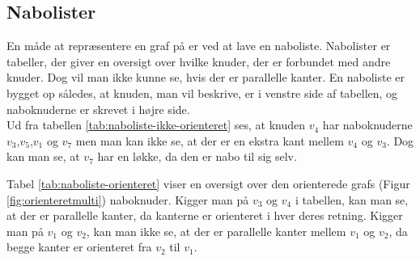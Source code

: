 \subsection{Nabolister}
En måde at repræsentere en graf på er ved at lave en naboliste. Nabolister er tabeller, der giver en oversigt over hvilke knuder, der er forbundet med andre knuder. Dog vil man ikke kunne se, hvis der er parallelle kanter. En naboliste er bygget op således, at knuden, man vil beskrive, er i venstre side af tabellen, og naboknuderne er skrevet i højre side. \\




Ud fra tabellen \ref{tab:naboliste-ikke-orienteret} ses, at knuden $v_4$ har naboknuderne $v_3$,$v_5$,$v_1$ og $v_7$ men man kan ikke se, at der er en ekstra kant mellem $v_4$ og $v_3$. Dog kan man se, at $v_7$ har en løkke, da den er nabo til sig selv.


Tabel \ref{tab:naboliste-orienteret} viser en oversigt over den orienterede grafs (Figur \ref{fig:orienteretmulti}) naboknuder. Kigger man på $v_3$ og $v_4$ i tabellen, kan man se, at der er parallelle kanter, da kanterne er orienteret i hver deres retning. Kigger man på $v_1$ og $v_2$, kan man ikke se, at der er parallelle kanter mellem $v_1$ og $v_2$, da begge kanter er orienteret fra $v_2$ til $v_1$.